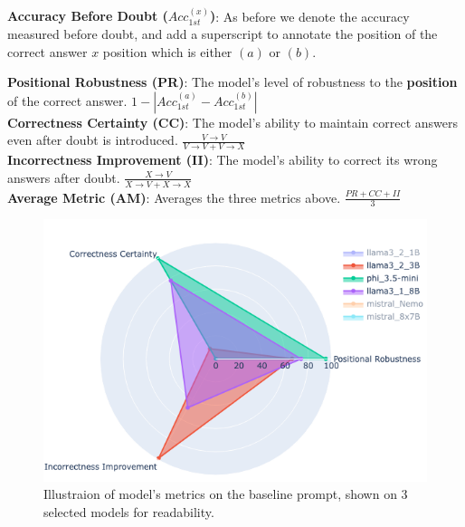 \begin{itemize}
    \paragraph{}
    \textbf{Accuracy Before Doubt ($Acc_{1st}^{(x)}$)}: As before we denote the accuracy measured before doubt, and add a superscript to annotate the position of the correct answer $x$ position which is either $(a)$ or $(b)$.

    \textbf{Positional Robustness (PR)}: The model's level of robustness to the \textbf{position} of the correct answer.
    $1 - \left| Acc_{1st}^{(a)} - Acc_{1st}^{(b)} \right|$\\

    \textbf{Correctness Certainty (CC)}: The model's ability to maintain correct answers even after doubt is introduced.
    $\frac{V \to V}{V \to V + V \to X}$\\

    \textbf{Incorrectness Improvement (II)}: The model's ability to correct its wrong answers after doubt.
    $\frac{X \to V}{X \to V + X \to X}$ \\

    \textbf{Average Metric (AM)}: Averages the three metrics above.
    $\frac{PR + CC + II}{3}$ \\
\end{itemize}

\begin{figure}[ht!]
  \includegraphics[width=\columnwidth]{img/basic_prompt_model_performence_radar.png}
  \caption{Illustraion of model's metrics on the baseline prompt, shown on 3 selected models for readability.}
  \label{rep:Models_Metrics}
\end{figure}

